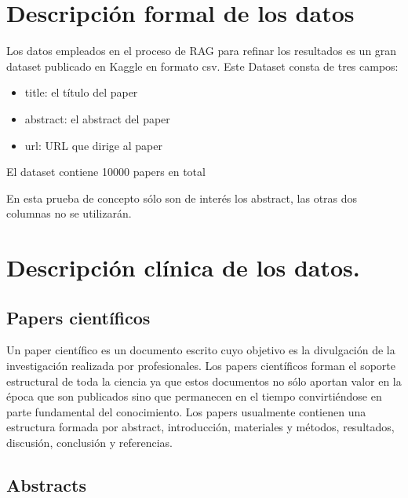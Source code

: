 

\section{Descripción formal de los datos}

Los datos empleados en el proceso de RAG para refinar los resultados es un gran dataset publicado en Kaggle en formato csv. Este Dataset consta de tres campos:

\begin{itemize}

    \item title: el título del paper
    \item abstract: el abstract del paper
    \item url: URL que dirige al paper

\end{itemize}

El dataset contiene 10000 papers en total

En esta prueba de concepto sólo son de interés los abstract, las otras dos columnas no se utilizarán.

\cite{Anandhu_H_abstracts_2023}
    
\section{Descripción clínica de los datos.}

\subsection{Papers científicos}

Un paper científico es un documento escrito cuyo objetivo es la divulgación de la investigación realizada por profesionales. Los papers científicos forman el soporte estructural de toda la ciencia ya que estos documentos no sólo aportan valor en la época que son publicados sino que permanecen en el tiempo convirtiéndose en parte fundamental del conocimiento.
Los papers usualmente contienen una estructura formada por abstract, introducción, materiales y métodos, resultados, discusión, conclusión y referencias.\cite{katz_elements_1985} 

\subsection{Abstracts}

